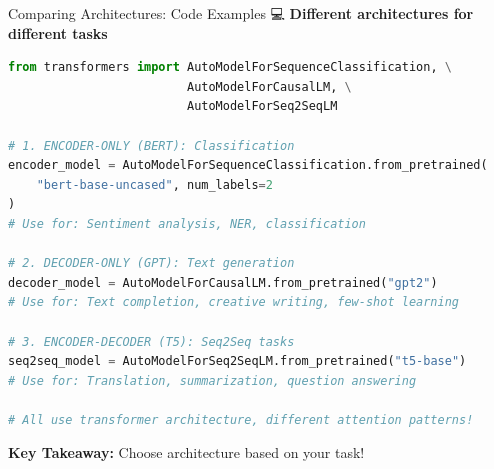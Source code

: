 \documentclass[aspectratio=169]{beamer}
\begin{document}
\begin{frame}[fragile]{Comparing Architectures: Code Examples 💻}
\textbf{Different architectures for different tasks}

\begin{lstlisting}[language=Python]
from transformers import AutoModelForSequenceClassification, \
                         AutoModelForCausalLM, \
                         AutoModelForSeq2SeqLM

# 1. ENCODER-ONLY (BERT): Classification
encoder_model = AutoModelForSequenceClassification.from_pretrained(
    "bert-base-uncased", num_labels=2
)
# Use for: Sentiment analysis, NER, classification

# 2. DECODER-ONLY (GPT): Text generation
decoder_model = AutoModelForCausalLM.from_pretrained("gpt2")
# Use for: Text completion, creative writing, few-shot learning

# 3. ENCODER-DECODER (T5): Seq2Seq tasks
seq2seq_model = AutoModelForSeq2SeqLM.from_pretrained("t5-base")
# Use for: Translation, summarization, question answering

# All use transformer architecture, different attention patterns!
\end{lstlisting}

\vspace{0.5em}
\textbf{Key Takeaway:} Choose architecture based on your task!
\end{frame}
\end{document}
